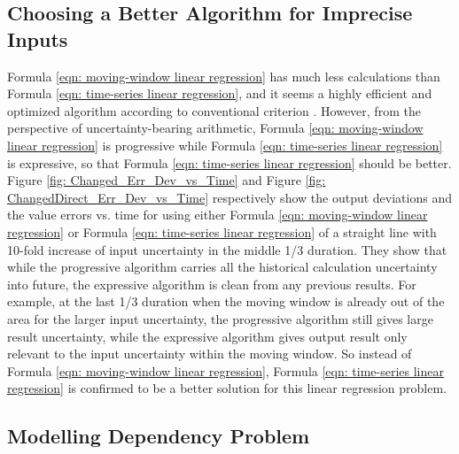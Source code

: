 \documentclass[twoside]{article}
\numberwithin{equation}{section}
\begin{document}
\subsection{ Choosing a Better Algorithm for Imprecise Inputs }

Formula \eqref{eqn: moving-window linear regression} has much less calculations than Formula \eqref{eqn: time-series linear regression}, and it seems a highly efficient and optimized algorithm according to conventional criterion \cite{Numerical_Recipes}.  However, from the perspective of uncertainty-bearing arithmetic, Formula \eqref{eqn: moving-window linear regression} is progressive while Formula \eqref{eqn: time-series linear regression} is expressive, so that Formula \eqref{eqn: time-series linear regression} should be better.  Figure \ref{fig: Changed_Err_Dev_vs_Time} and Figure \ref{fig: ChangedDirect_Err_Dev_vs_Time} respectively show the output deviations and the value errors vs. time for using either Formula \eqref{eqn: moving-window linear regression} or Formula \eqref{eqn: time-series linear regression} of a straight line with 10-fold increase of input uncertainty in the middle 1/3 duration.  They show that while the progressive algorithm carries all the historical calculation uncertainty into future, the expressive algorithm is clean from any previous results.  For example, at the last 1/3 duration when the moving window is already out of the area for the larger input uncertainty, the progressive algorithm still gives large result uncertainty, while the expressive algorithm gives output result only relevant to the input uncertainty within the moving window.  So instead of Formula \eqref{eqn: moving-window linear regression}, Formula \eqref{eqn: time-series linear regression} is confirmed to be a better solution for this linear regression problem.  

\subsection{ Modelling Dependency Problem }
\end{document}

